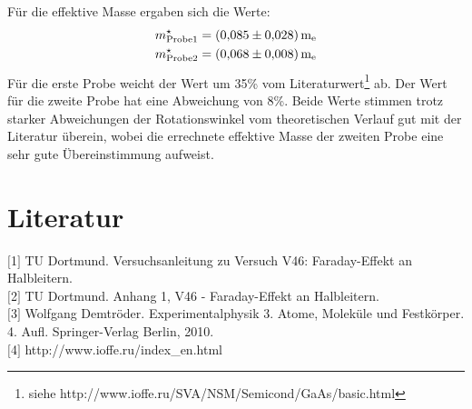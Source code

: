 Für die effektive Masse ergaben sich die Werte:
\begin{equation*} \label{eq:efmas}
\begin{split}
m^\star_\text{Probe1}& = \SI{0,085\pm0,028}{m_e}\\
m^\star_\text{Probe2}& = \SI{0,068\pm0,008}{m_e}
\end{split}
\end{equation*}
Für die erste Probe weicht der Wert um 35\% vom Literaturwert\footnote{siehe http://www.ioffe.ru/SVA/NSM/Semicond/GaAs/basic.html} ab.
Der Wert für die zweite Probe hat eine Abweichung von 8\%.
Beide Werte stimmen trotz starker Abweichungen der Rotationswinkel vom theoretischen Verlauf gut mit der Literatur überein, wobei die errechnete effektive Masse der zweiten Probe eine sehr gute Übereinstimmung aufweist.

















\section{Literatur}
\label{sec:literatur}
$[$1$]$ TU Dortmund. Versuchsanleitung zu Versuch V46: Faraday-Effekt an Halbleitern.\\
$[$2$]$ TU Dortmund. Anhang 1, V46 - Faraday-Effekt an Halbleitern.\\
$[$3$]$ Wolfgang Demtröder. Experimentalphysik 3. Atome, Moleküle und Festkörper. 4. Aufl. Springer-Verlag Berlin, 2010.\\
$[$4$]$ http://www.ioffe.ru/index_en.html\\